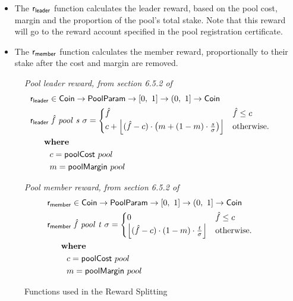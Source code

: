 \begin{itemize}
  \item The $\fun{r_{leader}}$ function calculates the leader reward, based on the pool cost,
    margin and the proportion of the pool's total stake.  Note that this reward will go to the
    reward account specified in the pool registration certificate.
  \item The $\fun{r_{member}}$ function calculates the member reward, proportionally to their
    stake after the cost and margin are removed.
\end{itemize}

\begin{figure}[htb]
  \emph{Pool leader reward, from section 6.5.2 of \cite{delegation_design}}
  \begin{align*}
      & \fun{r_{leader}} \in \Coin \to \PoolParam \to \unitInterval \to \unitIntervalNonNull \to \Coin \\
      & \lReward{\hat{f}}{pool}{s}{\sigma} =
        \begin{cases}
        \hat{f} & \hat{f} \leq c\\
        c + \floor*{(\hat{f} - c)\cdot\left(m + (1-m)\cdot\frac{s}{\sigma}\right) }&
        \text{otherwise.}
      \end{cases} \\
      & ~~~\where \\
      & ~~~~~~~c = \fun{poolCost}~pool \\
      & ~~~~~~~m = \fun{poolMargin}~pool \\
  \end{align*}

  \emph{Pool member reward, from section 6.5.2 of \cite{delegation_design}}
  \begin{align*}
    & \fun{r_{member}} \in \Coin \to \PoolParam \to \unitInterval \to \unitIntervalNonNull \to \Coin \\
    & \mReward{\hat{f}}{pool}{t}{\sigma} =
      \begin{cases}
        0 & \hat{f} \leq c\\
        \floor*{(\hat{f} - c)\cdot(1-m)\cdot\frac{t}{\sigma}} &
        \text{otherwise.}
      \end{cases} \\
    & ~~~\where \\
    & ~~~~~~~c = \fun{poolCost}~pool \\
    & ~~~~~~~m = \fun{poolMargin}~pool \\
  \end{align*}

  \caption{Functions used in the Reward Splitting}
  \label{fig:functions:reward-splitting}
\end{figure}


